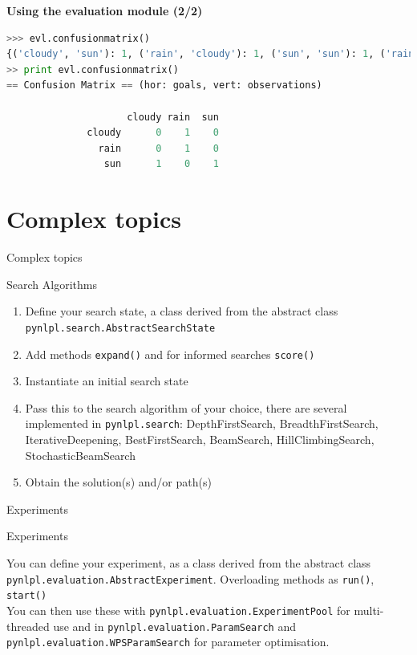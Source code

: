 \documentclass[compress]{beamer}
\begin{document}
\begin{frame}[fragile]
 
\textbf{Using the evaluation module (2/2)} 

\begin{lstlisting}[language=python]
>>> evl.confusionmatrix()
{('cloudy', 'sun'): 1, ('rain', 'cloudy'): 1, ('sun', 'sun'): 1, ('rain', 'rain'): 1}
>> print evl.confusionmatrix()
== Confusion Matrix == (hor: goals, vert: observations)

                     cloudy rain  sun
              cloudy      0    1    0
                rain      0    1    0
                 sun      1    0    1
\end{lstlisting}


\end{frame}

\section{Complex topics}

\begin{frame}{Complex topics}

\begin{block}{Search Algorithms} 
\begin{enumerate}
 \item Define your search state, a class derived from the abstract class \texttt{pynlpl.search.AbstractSearchState}
 \item Add methods \texttt{expand()} and for informed searches \texttt{score()}
 \item Instantiate an initial search state
 \item Pass this to the search algorithm of your choice, there are several implemented in \texttt{pynlpl.search}: DepthFirstSearch, BreadthFirstSearch, IterativeDeepening, BestFirstSearch, BeamSearch, HillClimbingSearch, StochasticBeamSearch
 \item Obtain the solution(s) and/or path(s)
\end{enumerate}
\end{block}


\end{frame}


\begin{frame}{Experiments}

\begin{block}{Experiments} 

You can define your experiment, as a class derived from the abstract class \texttt{pynlpl.evaluation.AbstractExperiment}. Overloading methods as \texttt{run()}, \texttt{start()} \\


You can then use these with \texttt{pynlpl.evaluation.ExperimentPool} for multi-threaded use and in \texttt{pynlpl.evaluation.ParamSearch} and \texttt{pynlpl.evaluation.WPSParamSearch} for parameter optimisation.

\end{block}

\end{frame}
\end{document}
